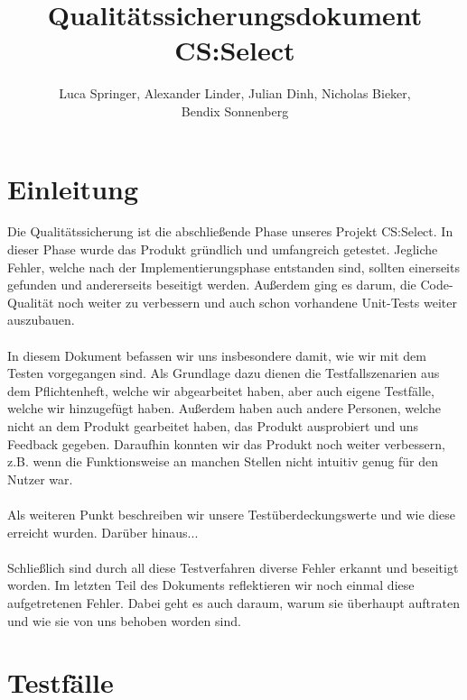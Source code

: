 \documentclass[a4paper]{scrreprt}
\begin{document}
    \title{Qualitätssicherungsdokument CS:Select}
    \author{Luca Springer, Alexander Linder, Julian Dinh, Nicholas Bieker,\\ Bendix Sonnenberg}
    \maketitle

    \tableofcontents
    \chapter{Einleitung}
    Die Qualitätssicherung ist die abschließende Phase unseres Projekt CS:Select. In dieser Phase wurde das Produkt
    gründlich und umfangreich getestet. Jegliche Fehler, welche nach der Implementierungsphase entstanden sind, sollten einerseits
    gefunden und andererseits beseitigt werden. Außerdem ging es darum,
    die Code-Qualität noch weiter zu verbessern und auch schon vorhandene Unit-Tests weiter auszubauen. \\
    \\
    In diesem Dokument befassen wir uns insbesondere damit, wie wir mit dem Testen vorgegangen sind. Als Grundlage dazu
    dienen die Testfallszenarien aus dem Pflichtenheft, welche wir abgearbeitet haben, aber auch eigene Testfälle, welche wir hinzugefügt haben. Außerdem
    haben auch andere Personen, welche nicht an dem Produkt gearbeitet haben, das Produkt ausprobiert und uns Feedback gegeben. Daraufhin
    konnten wir das Produkt noch weiter verbessern, z.B. wenn die Funktionsweise an manchen Stellen nicht intuitiv genug für den Nutzer war. \\
    \\
    Als weiteren Punkt beschreiben wir unsere Testüberdeckungswerte und wie diese erreicht wurden. Darüber hinaus... \\ %
    \\
    Schließlich sind durch all diese Testverfahren diverse Fehler erkannt und beseitigt worden. Im letzten Teil des Dokuments
    reflektieren wir noch einmal diese aufgetretenen Fehler. Dabei geht es auch daraum, warum sie überhaupt auftraten
    und wie sie von uns behoben worden sind.





    \chapter{Testfälle}
\end{document}
